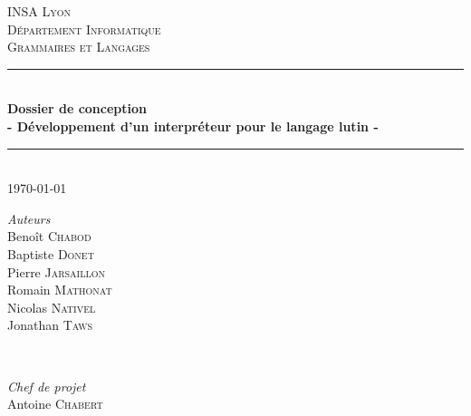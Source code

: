 \documentclass[12pt]{article}
\begin{document}
\begin{titlepage}

\newcommand{\HRule}{\rule{\linewidth}{0.5mm}} %

\center %
 

\vspace*{1cm}

\textsc{\LARGE INSA Lyon}\\[1.5cm] 
\textsc{\Large D\'epartement Informatique}\\[0.5cm] 
\textsc{\large Grammaires et Langages}\\[0.5cm] %


\HRule \\[0.4cm]
{ \huge \bfseries Dossier de conception}\\[0.1cm]
{\large \bfseries - Développement d'un interpréteur pour le langage lutin -} 
\HRule \\[1.5cm]
 

{\large \today}\\[2cm] %
 

\begin{minipage}{0.4\textwidth}
\begin{center} \large
\emph{Auteurs} \\
Benoît \textsc{Chabod} \\
Baptiste \textsc{Donet} \\
Pierre \textsc{Jarsaillon} \\
Romain \textsc{Mathonat} \\
Nicolas \textsc{Nativel} \\
Jonathan \textsc{Taws} \\
\end{center}
\end{minipage}
~
\begin{minipage}{0.4\textwidth}
\begin{center} \large
\emph{Chef de projet} \\
Antoine \textsc{Chabert} \\
\end{center}
\end{minipage}\\[5cm]


\end{titlepage}
\end{document}

